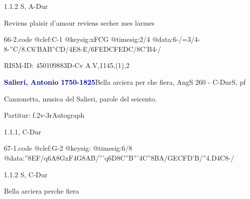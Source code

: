 \documentclass[a4paper, twocolumn, 11pt]{book}
\begin{document}
\newline %
\par 1.1.2  S, A-Dur\newline \begin{footnotesize} Reviens plaisir d'amour reviens secher mes larmes \end{footnotesize}  
\begin{filecontents*}{66-2.code}
@clef:C-1
@keysig:xFCG
@timesig:2/4
@data:6-/=3/4-8-''C/8.C6'B{AB}{''CD}/4E8-E/{6FE}{DC}{FE}{DC}/8C'B4-/
\end{filecontents*}
\newline %
\par RISM-ID: 450109883\newline D-Cv  A.V,1145,(1),2
\par \vspace{16pt} \textcolor{darkblue}{\textbf{Salieri, Antonio  1750-1825}}\hfillplus{[67]}\newline Bella arciera per che fiera, AngS 260 - C-Dur\newline S, pf
\par \begin{itshape} Canzonetta, musica del Salieri, parole del seicento.\end{itshape} 
\par \textcolor{darkblue}{}  Partitur: f.2v-3r\newline Autograph
\par 1.1.1, C-Dur  
\begin{filecontents*}{67-1.code}
@clef:G-2
@keysig:
@timesig:6/8
@data:''8{EF}/q6A{8GxF}4G{8AB}/'''q6D{8C''B}'''4C''{8BA}/{GEC}{FD'B}/''4.D4C8-/
\end{filecontents*}
\newline %
\par 1.1.2  S, C-Dur\newline \begin{footnotesize} Bella arciera perche fiera \end{footnotesize}  
\end{document}

